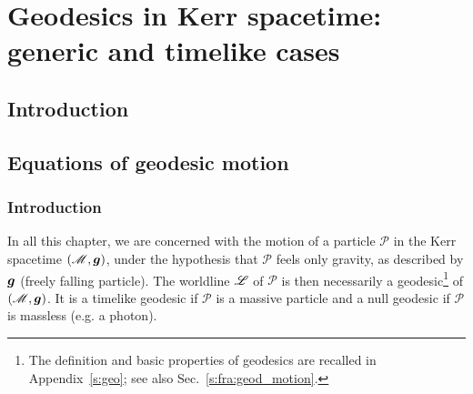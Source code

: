 \chapter{Geodesics in Kerr spacetime: generic and timelike cases}
\label{s:gek}

\minitoc

\section{Introduction}

\section{Equations of geodesic motion}

\subsection{Introduction} \label{s:gek:geod_motion_intro}

In all this chapter, we are concerned with the motion of a particle
$\mathscr{P}$ in the Kerr spacetime $(\mathscr{M},\bm{g})$, under the hypothesis that $\mathscr{P}$
feels only gravity, as described by $\bm{g}$ (freely falling particle).
The worldline $\mathscr{L}$ of $\mathscr{P}$
is then necessarily a geodesic\footnote{The definition and basic properties of geodesics
are recalled in Appendix~\ref{s:geo}; see also Sec.~\ref{s:fra:geod_motion}.} of
$(\mathscr{M},\bm{g})$. It is a timelike geodesic if $\mathscr{P}$ is a massive particle
and a null geodesic if $\mathscr{P}$ is massless (e.g. a photon).

